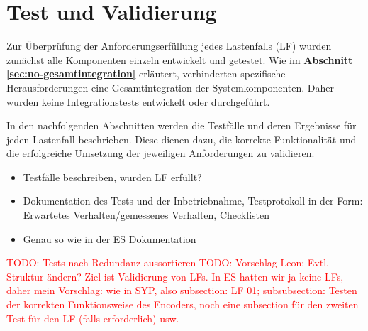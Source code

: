\newpage
\section{Test und Validierung}
\label{sec:test-validation}
Zur Überprüfung der Anforderungserfüllung jedes Lastenfalls (LF) wurden zunächst alle Komponenten einzeln entwickelt und getestet. Wie im \textbf{Abschnitt \ref{sec:no-gesamtintegration}} erläutert, verhinderten spezifische Herausforderungen eine Gesamtintegration der Systemkomponenten. Daher wurden keine Integrationstests entwickelt oder durchgeführt.

In den nachfolgenden Abschnitten werden die Testfälle und deren Ergebnisse für jeden Lastenfall beschrieben. Diese dienen dazu, die korrekte Funktionalität und die erfolgreiche Umsetzung der jeweiligen Anforderungen zu validieren.


\begin{itemize}
	\item Testfälle beschreiben, wurden LF erfüllt?
	\item Dokumentation des Tests und der Inbetriebnahme, Testprotokoll in der Form: Erwartetes Verhalten/gemessenes Verhalten, Checklisten
	\item Genau so wie in der ES Dokumentation
\end{itemize}

\textcolor{red}{TODO: Tests nach Redundanz aussortieren}
\textcolor{red}{TODO: Vorschlag Leon: Evtl. Struktur ändern? Ziel ist Validierung von LFs. In ES hatten wir ja keine LFs, daher mein Vorschlag: wie in SYP, also subsection: LF 01; subsubsection: Testen der korrekten Funktionsweise des Encoders, noch eine subsection für den zweiten Test für den LF (falls erforderlich) usw.}










